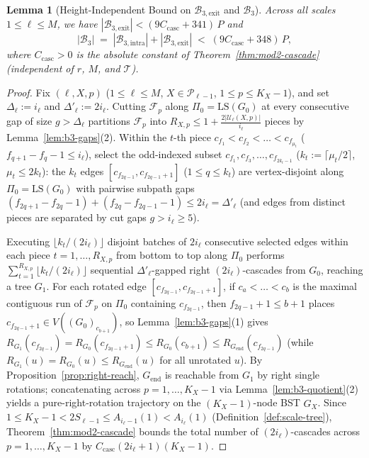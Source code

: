\documentclass[11pt]{article}
\newtheorem{lemma}[theorem]{Lemma}
\theoremstyle{definition}
\theoremstyle{remark}
\newcommand{\LS}{\mathrm{LS}}
\begin{document}
\begin{lemma}[Height-Independent Bound on $\mathcal{B}_{3,\mathrm{exit}}$ and $\mathcal{B}_3$]
\label{lem:bucket-b3-exit}
Across all scales $1 \le \ell \le M$, we have $|\mathcal{B}_{3,\mathrm{exit}}| < (9 C_{\mathrm{casc}} + 341)\,P$ and
\[
|\mathcal{B}_3| \;=\; |\mathcal{B}_{3,\mathrm{intra}}| + |\mathcal{B}_{3,\mathrm{exit}}| \;<\; (9 C_{\mathrm{casc}} + 348)\,P,
\]
where $C_{\mathrm{casc}} > 0$ is the absolute constant of Theorem~\ref{thm:mod2-cascade} (independent of $r$, $M$, and $\mathcal{T}$).
\end{lemma}

\begin{proof}
Fix $(\ell, X, p)$ ($1 \le \ell \le M$, $X \in \mathcal{P}_{\ell-1}$, $1 \le p \le K_X - 1$), and set $\Delta_\ell := i_\ell$ and $\Delta'_\ell := 2 i_\ell$. Cutting $\mathcal{F}_p$ along $\Pi_0 = \LS(G_0)$ at every consecutive gap of size $g > \Delta_\ell$ partitions $\mathcal{F}_p$ into $R_{X, p} \le 1 + \frac{2|\mathcal{U}_\ell(X, p)|}{i_\ell}$ pieces by Lemma~\ref{lem:b3-gaps}(2). Within the $t$-th piece $c_{f_1} < c_{f_2} < \dots < c_{f_{\mu_t}}$ ($f_{q+1} - f_q - 1 \le i_\ell$), select the odd-indexed subset $c_{f_1}, c_{f_3}, \dots, c_{f_{2 k_t - 1}}$ ($k_t := \lceil \mu_t / 2 \rceil$, $\mu_t \le 2 k_t$): the $k_t$ edges $[c_{f_{2q-1}}, c_{f_{2q-1}+1}]$ ($1 \le q \le k_t$) are vertex-disjoint along $\Pi_0 = \LS(G_0)$ with pairwise subpath gaps $(f_{2q+1} - f_{2q} - 1) + (f_{2q} - f_{2q-1} - 1) \le 2 i_\ell = \Delta'_\ell$ (and edges from distinct pieces are separated by cut gaps $g > i_\ell \ge 5$).

Executing $\lfloor k_t / (2 i_\ell) \rfloor$ disjoint batches of $2 i_\ell$ consecutive selected edges within each piece $t = 1, \dots, R_{X, p}$ from bottom to top along $\Pi_0$ performs $\sum_{t=1}^{R_{X, p}} \lfloor k_t / (2 i_\ell) \rfloor$ sequential $\Delta'_\ell$-gapped right $(2 i_\ell)$-cascades from $G_0$, reaching a tree $G_1$. For each rotated edge $[c_{f_{2q-1}}, c_{f_{2q-1}+1}]$, if $c_a < \dots < c_b$ is the maximal contiguous run of $\mathcal{F}_p$ on $\Pi_0$ containing $c_{f_{2q-1}}$, then $f_{2q-1} + 1 \le b + 1$ places $c_{f_{2q-1}+1} \in V((G_0)_{c_{b+1}})$, so Lemma~\ref{lem:b3-gaps}(1) gives $R_{G_1}(c_{f_{2q-1}}) = R_{G_0}(c_{f_{2q-1}+1}) \le R_{G_0}(c_{b+1}) \le R_{G_{\mathrm{end}}}(c_{f_{2q-1}})$ (while $R_{G_1}(u) = R_{G_0}(u) \le R_{G_{\mathrm{end}}}(u)$ for all unrotated $u$). By Proposition~\ref{prop:right-reach}, $G_{\mathrm{end}}$ is reachable from $G_1$ by right single rotations; concatenating across $p = 1, \dots, K_X - 1$ via Lemma~\ref{lem:b3-quotient}(2) yields a pure-right-rotation trajectory on the $(K_X - 1)$-node BST $\widehat{G}_X$. Since $1 \le K_X - 1 < 2 S_{\ell-1} \le A_{i_\ell - 1}(1) < A_{i_\ell}(1)$ (Definition~\ref{def:scale-tree}), Theorem~\ref{thm:mod2-cascade} bounds the total number of $(2 i_\ell)$-cascades across $p = 1, \dots, K_X - 1$ by $C_{\mathrm{casc}}(2 i_\ell + 1)(K_X - 1)$.


\end{proof}
\end{document}
